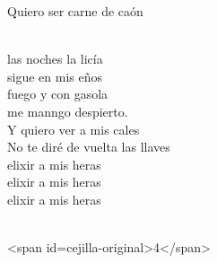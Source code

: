 \begin{cancion}[El Conticinio][Guitarricadelafuente]
	Quiero ser carne de caón\\\jump\\
	\begin{chorus}%
	 las noches la licía \\
	sigue en mis eños\\
	 fuego y con gasola \\
	me manngo despierto.\\
\jump
	Y quiero ver a mis cales\\
	No te diré de vuelta las llaves\\
	elixir a mis heras   \\
	elixir a mis heras   \\
	elixir a mis heras   \\
	\end{chorus}%
	\jump\\
<span id=cejilla-original>4</span>\\
\end{cancion}%

